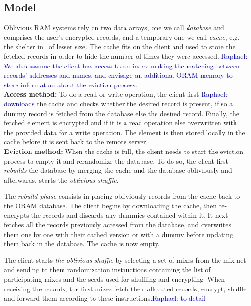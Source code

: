 \documentclass[USenglish,oneside,twocolumn]{article}
\newcommand{\raphael}[1]{\textcolor{blue}{Raphael: #1}}
\begin{document}
\subsection{Model}\label{Model}

Oblivious RAM systems rely on two data arrays, one we call \emph{database} and comprises the user's encrypted records, and a temporary one we call \emph{cache}, e.g. the shelter in~\cite{goldreich87} of lesser size. The cache fits on the client and used to store the fetched records in order to hide the number of times they were accessed. \raphael{We also assume the client has access to an index making the matching between records' addresses and names, and envisage an additional ORAM memory to store information about the eviction process.}\\

\noindent\textbf{Access method:} To do a read or write operation, the client first \raphael{downloads} the cache and checks whether the desired record is present, if so a dummy record is fetched from the database else the desired record. Finally, the fetched element is encrypted and if it is a read operation else overwritten with the provided data for a write operation. The element is then stored locally in the cache before it is sent back to the remote server.\\

\noindent\textbf{Eviction method:} When the cache is full, the client needs to start the eviction process to empty it and rerandomize the database. To do so, the client first \textit{rebuilds} the database by merging the cache and the database obliviously and afterwards, starts the \textit{oblivious shuffle}.

The \emph{rebuild phase} consists in placing obliviously records from the cache back to the ORAM database. The client begins by downloading the cache, then re-encrypts the records and discards any dummies contained within it. It next fetches all the records previously accessed from the database, and overwrites them one by one with their cached version or with a dummy before updating them back in the database. The cache is now empty.

The client starts \emph{the oblivious shuffle} by selecting a set of mixes from the mix-net and sending to them randomization instructions containing the list of participating mixes and the seeds used for shuffling and encrypting. When receiving the records, the first mixes fetch their allocated records, encrypt, shuffle and forward them according to these instructions.\raphael{to detail}
\end{document}
